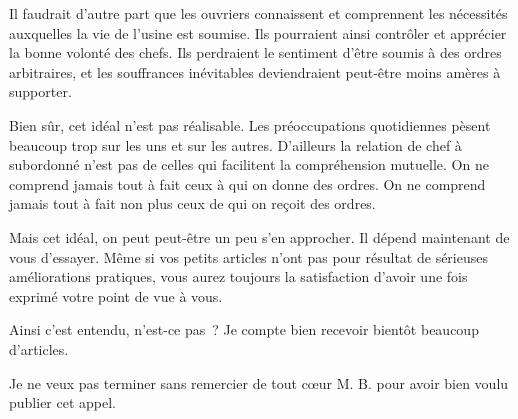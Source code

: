 \documentclass[french,twoside]{book} %
\begin{document}
Il faudrait d'autre part que les ouvriers connaissent et comprennent les nécessités auxquelles la vie de l'usine est soumise. Ils pourraient ainsi contrôler et apprécier la bonne volonté des chefs. Ils perdraient le sentiment d'être soumis à des ordres arbitraires, et les souffrances inévitables deviendraient peut-être moins amères à supporter.\par
Bien sûr, cet idéal n'est pas réalisable. Les préoccupations quotidiennes pèsent beaucoup trop sur les uns et sur les autres. D'ailleurs la relation de chef à subordonné n'est pas de celles qui facilitent la compréhension mutuelle. On ne comprend jamais tout à fait ceux à qui on donne des ordres. On ne comprend jamais tout à fait non plus ceux de qui on reçoit des ordres.\par
Mais cet idéal, on peut peut-être un peu s'en approcher. Il dépend maintenant de vous d'essayer. Même si vos petits articles n'ont pas pour résultat de sérieuses améliorations pratiques, vous aurez toujours la satisfaction d'avoir une fois exprimé votre point de vue à vous.\par
Ainsi c'est entendu, n'est-ce pas ? Je compte bien recevoir bientôt beaucoup d'articles.\par
Je ne veux pas terminer sans remercier de tout cœur M. B. pour avoir bien voulu publier cet appel.\par
\end{document}
